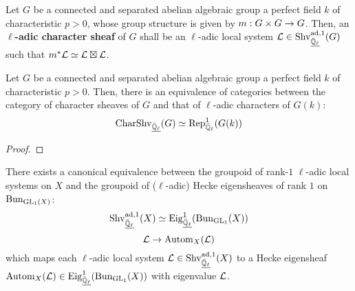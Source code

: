        \begin{definition} \label{def: character_sheaves}
            Let $G$ be a connected and separated abelian algebraic group a perfect field $k$ of characteristic $p > 0$, whose group structure is given by $m: G \x G \to G$. Then, an \textbf{$\ell$-adic character sheaf} of $G$ shall be an $\ell$-adic local system $\mathcal{L} \in \mathrm{Shv}_{\underline{\bar{\mathbb{Q}}_{\ell}}}^{\mathrm{ad}, 1}(G)$ such that $m^*\mathcal{L} \simeq \mathcal{L} \boxtimes \mathcal{L}$. 
        \end{definition}
        \begin{lemma} \label{lemma: character_sheav es_of_group_schemes_and_group_characters}
            Let $G$ be a connected and separated abelian algebraic group a perfect field $k$ of characteristic $p > 0$. Then, there is an equivalence of categories between the category of character sheaves of $G$ and that of $\ell$-adic characters of $G(k)$:
                $$\mathrm{Char}\mathrm{Shv}_{\underline{\bar{\mathbb{Q}}_{\ell}}}(G) \simeq \mathrm{Rep}^1_{\bar{\mathbb{Q}}_{\ell}}(G(k))$$
        \end{lemma}
            \begin{proof}
                
            \end{proof}
        \begin{theorem} \label{theorem: unramified_abelian_geometric_class_field_theory}
            There exists a canonical equivalence between the groupoid of rank-$1$ $\ell$-adic local systems on $X$ and the groupoid of ($\ell$-adic) Hecke eigensheaves of rank $1$ on $\mathrm{Bun}_{\operatorname{GL}_1(X)}$:
                $$\mathrm{Shv}_{\underline{\bar{\mathbb{Q}}_{\ell}}}^{\mathrm{ad}, 1}(X) \simeq \mathrm{Eig}_{\underline{\bar{\mathbb{Q}}_{\ell}}}^1(\mathrm{Bun}_{\operatorname{GL}_1}(X))$$
                $$\mathcal{L} \to \mathrm{Autom}_X(\mathcal{L})$$
            which maps each $\ell$-adic local system $\mathcal{L} \in \mathrm{Shv}_{\underline{\bar{\mathbb{Q}}_{\ell}}}^{\mathrm{ad}, 1}(X)$ to a Hecke eigensheaf $\mathrm{Autom}_X(\mathcal{L}) \in \mathrm{Eig}_{\underline{\bar{\mathbb{Q}}_{\ell}}}^1(\mathrm{Bun}_{\operatorname{GL}_1}(X))$ with eigenvalue $\mathcal{L}$.
        \end{theorem}
